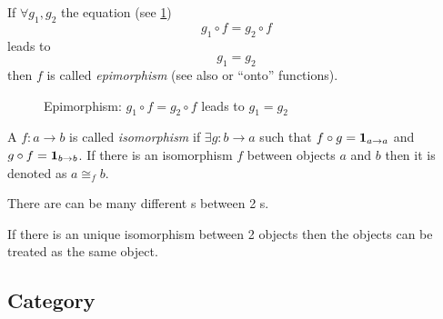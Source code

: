 \begin{definition}[Epimorphism]
  \label{def:epimorphism}
  If $\forall g_1, g_2$ the equation (see \cref{fig:epimorphism})
  \[
  g_1 \circ f = g_2 \circ f
  \]
  leads to 
  \[
  g_1 = g_2
  \]
  then $f$ is called \textit{epimorphism} (see also
   or ``onto'' functions).
\begin{figure}[H]
  \centering
  \caption{Epimorphism: $g_1 \circ f = g_2 \circ f$ leads to $g_1 = g_2$}
  \label{fig:epimorphism}
\end{figure}

\end{definition}

\begin{definition}[Isomorphism]
\label{def:isomorphism} 
A  $f: a \to b$ is called \textit{isomorphism} if
$\exists g: b \to a$ such that $f \circ g = \mathbf{1}_{ a \to a }$ 
and $g \circ f = \mathbf{1}_{ b \to b }$.  
If there is an isomorphism $f$ between objects $a$ and $b$
then it is denoted as $a \cong_f b$. 
\end{definition}

\begin{remark}[Isomorphism]
\label{rem:isomorphism}
There are can be many different s between 2
s. 

If there is an unique isomorphism between 2 objects then the objects
can be treated as the same object.
\end{remark}

\subsection{Category}

